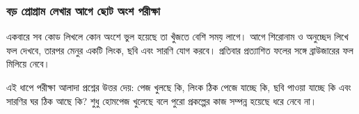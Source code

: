 \subsubsection{বড় প্রোগ্রাম লেখার আগে ছোট অংশ পরীক্ষা}
একবারে সব কোড লিখলে কোন অংশে ভুল হয়েছে তা খুঁজতে বেশি সময় লাগে। আগে শিরোনাম ও অনুচ্ছেদ লিখে ফল দেখবে, তারপর মেনুর একটি লিংক, ছবি এবং সারণি যোগ করবে। প্রতিবার প্রত্যাশিত ফলের সঙ্গে ব্রাউজারের ফল মিলিয়ে নেবে।

এই ধাপে পরীক্ষা আলাদা প্রশ্নের উত্তর দেয়: পেজ খুলছে কি, লিংক ঠিক পেজে যাচ্ছে কি, ছবি পাওয়া যাচ্ছে কি এবং সারণির ঘর ঠিক আছে কি? শুধু হোমপেজ খুলেছে বলে পুরো প্রকল্পের কাজ সম্পন্ন হয়েছে ধরে নেবে না।

